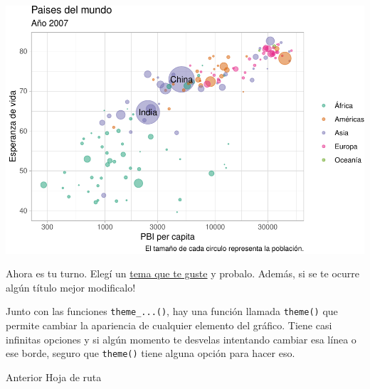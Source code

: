\documentclass[
  openany]{book}
\begin{document}
\begin{center}\includegraphics[width=1\linewidth]{DT6_files/figure-latex/unnamed-chunk-138-1} \end{center}

Ahora es tu turno.
Elegí un \href{https://es.r4ds.hadley.nz/images/visualization-themes.png}{tema que te guste} y probalo.
Además, si se te ocurre algún título mejor modificalo!

Junto con las funciones \texttt{theme\_...()}, hay una función llamada \texttt{theme()} que permite cambiar la apariencia de cualquier elemento del gráfico.
Tiene casi infinitas opciones y si algún momento te desvelas intentando cambiar esa línea o ese borde, seguro que \texttt{theme()} tiene alguna opción para hacer eso.

Anterior Hoja de ruta
\end{document}
